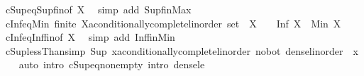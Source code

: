 \begin{isabellebody}
\ cSup{\isacharunderscore}{\kern0pt}eq{\isacharunderscore}{\kern0pt}Sup{\isacharunderscore}{\kern0pt}fin{\isacharbrackleft}{\kern0pt}of\ X{\isacharbrackright}{\kern0pt}\ \isamarkupfalse%
\ {\isacharparenleft}{\kern0pt}simp\ add{\isacharcolon}{\kern0pt}\ Sup{\isacharunderscore}{\kern0pt}fin{\isacharunderscore}{\kern0pt}Max{\isacharparenright}{\kern0pt}%
\endisatagproof
{\isafoldproof}%
%
\isadelimproof
\isanewline
%
\endisadelimproof
\isanewline
{}\isamarkupfalse%
\ cInf{\isacharunderscore}{\kern0pt}eq{\isacharunderscore}{\kern0pt}Min{\isacharcolon}{\kern0pt}\ {\isachardoublequoteopen}finite\ {\isacharparenleft}{\kern0pt}X{\isacharcolon}{\kern0pt}{\isacharcolon}{\kern0pt}{\isacharprime}{\kern0pt}a{\isacharcolon}{\kern0pt}{\isacharcolon}{\kern0pt}conditionally{\isacharunderscore}{\kern0pt}complete{\isacharunderscore}{\kern0pt}linorder\ set{\isacharparenright}{\kern0pt}\ {\isasymLongrightarrow}\ X\ {\isasymnoteq}\ {\isacharbraceleft}{\kern0pt}{\isacharbraceright}{\kern0pt}\ {\isasymLongrightarrow}\ Inf\ X\ {\isacharequal}{\kern0pt}\ Min\ X{\isachardoublequoteclose}\isanewline
%
\isadelimproof
\ \ %
\endisadelimproof
%
\isatagproof
{}\isamarkupfalse%
\ cInf{\isacharunderscore}{\kern0pt}eq{\isacharunderscore}{\kern0pt}Inf{\isacharunderscore}{\kern0pt}fin{\isacharbrackleft}{\kern0pt}of\ X{\isacharbrackright}{\kern0pt}\ \isamarkupfalse%
\ {\isacharparenleft}{\kern0pt}simp\ add{\isacharcolon}{\kern0pt}\ Inf{\isacharunderscore}{\kern0pt}fin{\isacharunderscore}{\kern0pt}Min{\isacharparenright}{\kern0pt}%
\endisatagproof
{\isafoldproof}%
%
\isadelimproof
\isanewline
%
\endisadelimproof
\isanewline
{}\isamarkupfalse%
\ cSup{\isacharunderscore}{\kern0pt}lessThan{\isacharbrackleft}{\kern0pt}simp{\isacharbrackright}{\kern0pt}{\isacharcolon}{\kern0pt}\ {\isachardoublequoteopen}Sup\ {\isacharbraceleft}{\kern0pt}{\isachardot}{\kern0pt}{\isachardot}{\kern0pt}{\isacharless}{\kern0pt}x{\isacharcolon}{\kern0pt}{\isacharcolon}{\kern0pt}{\isacharprime}{\kern0pt}a{\isacharcolon}{\kern0pt}{\isacharcolon}{\kern0pt}{\isacharbraceleft}{\kern0pt}conditionally{\isacharunderscore}{\kern0pt}complete{\isacharunderscore}{\kern0pt}linorder{\isacharcomma}{\kern0pt}\ no{\isacharunderscore}{\kern0pt}bot{\isacharcomma}{\kern0pt}\ dense{\isacharunderscore}{\kern0pt}linorder{\isacharbraceright}{\kern0pt}{\isacharbraceright}{\kern0pt}\ {\isacharequal}{\kern0pt}\ x{\isachardoublequoteclose}\isanewline
%
\isadelimproof
\ \ %
\endisadelimproof
%
\isatagproof
{}\isamarkupfalse%
\ {\isacharparenleft}{\kern0pt}auto\ intro{\isacharbang}{\kern0pt}{\isacharcolon}{\kern0pt}\ cSup{\isacharunderscore}{\kern0pt}eq{\isacharunderscore}{\kern0pt}non{\isacharunderscore}{\kern0pt}empty\ intro{\isacharcolon}{\kern0pt}\ dense{\isacharunderscore}{\kern0pt}le{\isacharparenright}{\kern0pt}%

\end{isabellebody}

